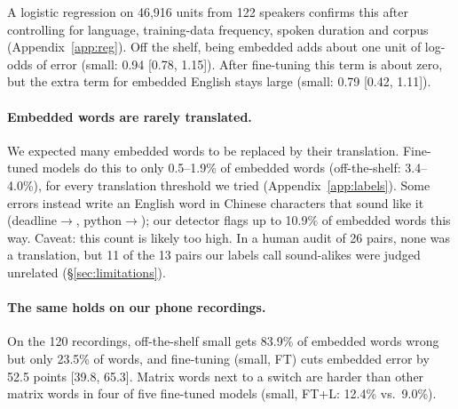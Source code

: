 A logistic regression on 46{,}916 units from 122 speakers confirms this after controlling for language, training-data frequency, spoken duration and corpus (Appendix~\ref{app:reg}). Off the shelf, being embedded adds about one unit of log-odds of error (small: 0.94 [0.78, 1.15]). After fine-tuning this term is about zero, but the extra term for embedded English stays large (small: 0.79 [0.42, 1.11]).

\paragraph{Embedded words are rarely translated.}
We expected many embedded words to be replaced by their translation. Fine-tuned models do this to only 0.5--1.9\% of embedded words (off-the-shelf: 3.4--4.0\%), for every translation threshold we tried (Appendix~\ref{app:labels}). Some errors instead write an English word in Chinese characters that sound like it (deadline$\rightarrow$, python$\rightarrow$); our detector flags up to 10.9\% of embedded words this way. Caveat: this count is likely too high. In a human audit of 26 pairs, none was a translation, but 11 of the 13 pairs our labels call sound-alikes were judged unrelated (\S\ref{sec:limitations}).

\paragraph{The same holds on our phone recordings.}
On the 120 recordings, off-the-shelf small gets 83.9\% of embedded words wrong but only 23.5\% of \Mi{} words, and fine-tuning (small, FT) cuts embedded error by 52.5 points [39.8, 65.3]. Matrix words next to a switch are harder than other matrix words in four of five fine-tuned models (small, FT+L: 12.4\% vs.\ 9.0\%).
